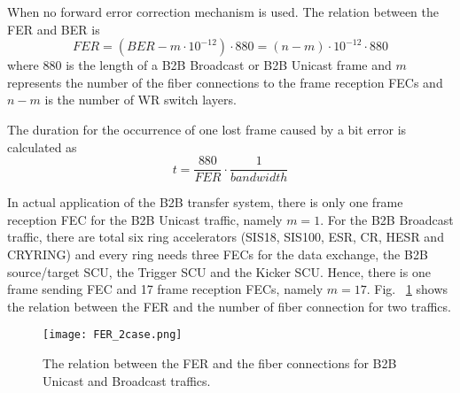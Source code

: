 When no forward error correction mechanism is used. The relation between the FER and BER is
\begin{equation}
\label{m-n}
	FER=(BER-m\cdot10^{-12})\cdot 880=(n-m)\cdot10^{-12}\cdot 880
\end{equation}
where 880 is the length of a B2B Broadcast or B2B Unicast frame and $m$ represents the number of the fiber connections to the frame reception FECs and $n-m$ is the number of WR switch layers.  

The duration for the occurrence of one lost frame caused by a bit error is calculated as 
\begin{equation}
\label{duration}
	t=\frac{880}{FER}\cdot \frac{1}{bandwidth}
\end{equation}
 
In actual application of the B2B transfer system, there is only one frame reception FEC for the B2B Unicast traffic, namely $m=1$. For the B2B Broadcast traffic, there are total six ring accelerators (SIS18, SIS100, ESR, CR, HESR and CRYRING) and every ring needs three FECs for the data exchange, the B2B source/target SCU, the Trigger SCU and the Kicker SCU. Hence, there is one frame sending FEC and 17 frame reception FECs, namely $m=17$. Fig. ~\ref{FER_2case} shows the relation between the FER and the number of fiber connection for two traffics.   
\begin{figure}[H]
   \centering   
   \texttt{[image: FER\_2case.png]}
   \caption{The relation between the FER and the fiber connections for B2B Unicast and Broadcast traffics.}
   \label{FER_2case}
\end{figure}


